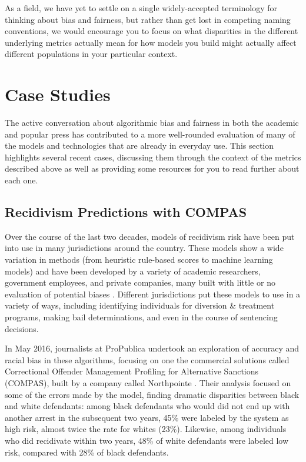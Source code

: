 \documentclass[]{krantz}
\begin{document}
As a field, we have yet to settle on a single widely-accepted
terminology for thinking about bias and fairness, but rather than get
lost in competing naming conventions, we would encourage you to focus on
what disparities in the different underlying metrics actually mean for
how models you build might actually affect different populations in your
particular context.

\section{Case Studies}\label{case-studies}

The active conversation about algorithmic bias and fairness in both the
academic and popular press has contributed to a more well-rounded
evaluation of many of the models and technologies that are already in
everyday use. This section highlights several recent cases, discussing
them through the context of the metrics described above as well as
providing some resources for you to read further about each one.

\subsection{Recidivism Predictions with COMPAS}\label{sec:compascase}

Over the course of the last two decades, models of recidivism risk have
been put into use in many jurisdictions around the country. These models
show a wide variation in methods (from heuristic rule-based scores to
machine learning models) and have been developed by a variety of
academic researchers, government employees, and private companies, many
built with little or no evaluation of potential biases
\citep{desmarais2013}. Different jurisdictions put these models to use
in a variety of ways, including identifying individuals for diversion \&
treatment programs, making bail determinations, and even in the course
of sentencing decisions.

In May 2016, journalists at ProPublica undertook an exploration of
accuracy and racial bias in these algorithms, focusing on one the
commercial solutions called Correctional Offender Management Profiling
for Alternative Sanctions (COMPAS), built by a company called
Northpointe \citep{angwin2016, larson2016}. Their analysis focused on
some of the errors made by the model, finding dramatic disparities
between black and white defendants: among black defendants who would did
not end up with another arrest in the subsequent two years, 45\% were
labeled by the system as high risk, almost twice the rate for whites
(23\%). Likewise, among individuals who did recidivate within two years,
48\% of white defendants were labeled low risk, compared with 28\% of
black defendants.
\end{document}
